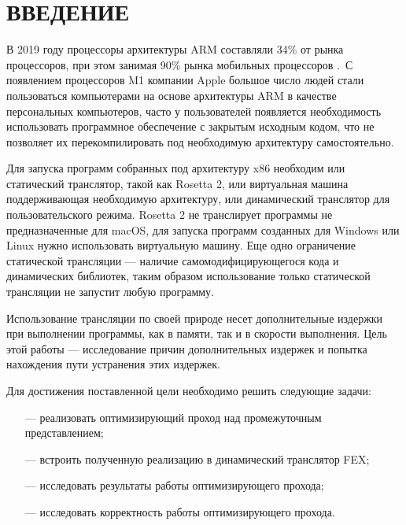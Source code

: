 \section*{ВВЕДЕНИЕ}

В 2019 году процессоры архитектуры ARM составляли 34\% от рынка процессоров, при этом занимая 90\% рынка мобильных процессоров \cite{arm_report}. С появлением процессоров M1 компании Apple большое число людей стали пользоваться компьютерами на основе архитектуры ARM в качестве персональных компьютеров, часто у пользователей появляется необходимость использовать программное обеспечение с закрытым исходным кодом, что не позволяет их перекомпилировать под необходимую архитектуру самостоятельно.

Для запуска программ собранных под архитектуру x86 необходим или статический транслятор, такой как Rosetta 2, или виртуальная машина поддерживающая необходимую архитектуру, или динамический транслятор для пользовательского режима. Rosetta 2 не транслирует программы не предназначенные для macOS, для запуска программ созданных для Windows или Linux нужно использовать виртуальную машину. Еще одно ограничение статической трансляции --- наличие самомодифицирующегося кода и динамических библиотек, таким образом использование только статической трансляции не запустит любую программу. \cite{fast_bin}

Использование трансляции по своей природе несет дополнительные издержки при выполнении программы, как в памяти, так и в скорости выполнения. Цель этой работы --- исследование причин дополнительных издержек и попытка нахождения пути устранения этих издержек.

Для достижения поставленной цели необходимо решить следующие задачи:

\begin{itemize}[leftmargin=1.6\parindent]
	\item [---] реализовать оптимизирующий проход над промежуточным представлением;
	\item [---] встроить полученную реализацию в динамический транслятор FEX;
	\item [---] исследовать результаты работы оптимизирующего прохода;
	\item [---] исследовать корректность работы оптимизирующего прохода.
\end{itemize}
\pagebreak